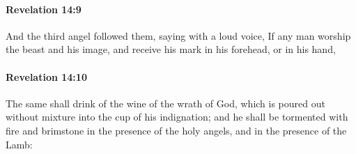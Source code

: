 		\paragraph{Revelation 14:9} %
			\label{REVELATIONNT-14-9}

			And the third angel followed them, saying with a loud voice, If any man worship the beast and his image, and receive his mark in his forehead, or in his hand,

			\begin{framed}
			\scriptsize
				\begin{compactdesc}
					\item[SBLG] 
				\end{compactdesc}
			\end{framed}

		\paragraph{Revelation 14:10} %
			\label{REVELATIONNT-14-10}

			The same shall drink of the wine of the wrath of God, which is poured out without mixture into the cup of his indignation; and he shall be tormented with fire and brimstone in the presence of the holy angels, and in the presence of the Lamb:

